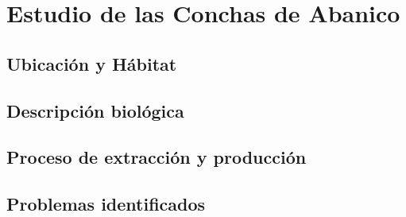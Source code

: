 \chapter{Estudio de las  Conchas de Abanico}
\label{cap:conchasabanico}


\section{Ubicación y Hábitat}

\section{Descripción biológica}

\section{Proceso de extracción y producción}

\section{Problemas identificados}


